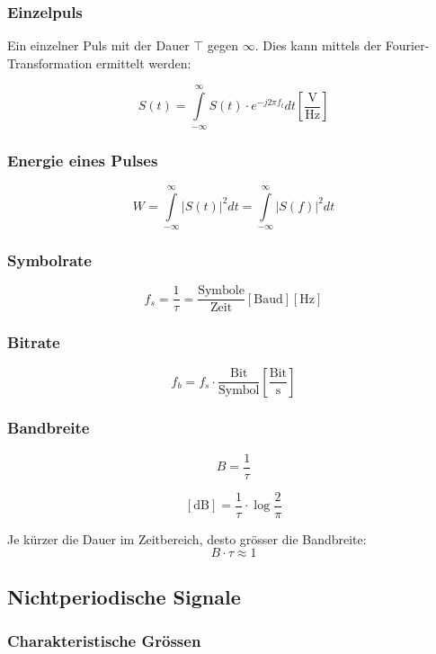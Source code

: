 \begin{multicols}{2}
\subsubsection{Einzelpuls}
	Ein einzelner Puls mit der Dauer $\top$ gegen $\infty$. Dies kann mittels der Fourier-Transformation ermittelt werden:
	
	\[
		S(t) = \int\limits_{-\infty}^{\infty}{
			S(t) \cdot e^{-j 2 \pi f_t} dt
		}
		\left[\frac{\text{V}}{\text{Hz}}\right]
	\]

\subsubsection{Energie eines Pulses}

	\[
		W = \int\limits_{-\infty}^{\infty}{
				\left| S(t) \right|^2 dt
			} = \int\limits_{-\infty}^{\infty}{
				\left| S(f) \right|^2 dt
			}
	\]

\subsubsection{Symbolrate}
	\[
		f_s = \frac{1}{\tau} = \frac{\text{Symbole}}{\text{Zeit}}
		\left[\text{Baud}\right] \left[\text{Hz}\right]
	\]

\subsubsection{Bitrate}
	\[
		f_b = f_s \cdot \frac{\text{Bit}}{\text{Symbol}} %
		\left[\frac{\text{Bit}}{\text{s}}\right]
	\]
	
\subsubsection{Bandbreite}
	\[
		B=\frac{1}{\tau}
	\]
	
	\[
		[\text{dB}] = \frac{1}{\tau} \cdot \log{\frac{2}{\pi}}
	\]

Je kürzer die Dauer im Zeitbereich, desto grösser die Bandbreite:
	\[
		B \cdot \tau \approx 1
	\]

\subsection{Nichtperiodische Signale}

\subsubsection{Charakteristische Grössen}
	

\end{multicols}
